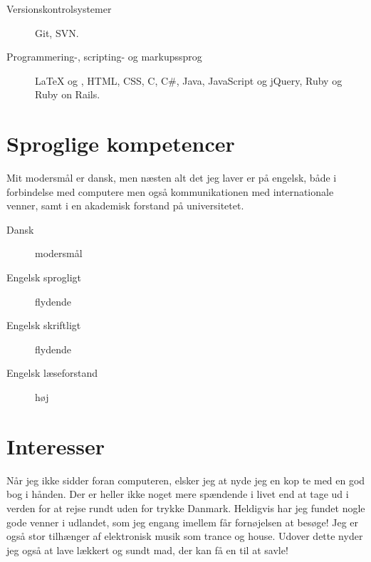 \documentclass[margin,line,a4paper]{resume}
\begin{document}
\begin{resume}
\begin{description}
  \item[Versionskontrolsystemer] Git, SVN.

  \item[Programmering-, scripting- og markupssprog] \LaTeX{} og
  \XeTeX{}, HTML, CSS, C, C\#, Java, JavaScript og jQuery, Ruby og Ruby
  on Rails.

\end{description}

\section{\mysidestyle Sproglige kompetencer}
Mit modersmål er dansk, men næsten alt det jeg laver er på engelsk,
både i forbindelse med computere men også kommunikationen med
internationale venner, samt i en akademisk forstand på universitetet.

\begin{description}
  \item[Dansk] modersmål
  \item[Engelsk sprogligt] flydende
  \item[Engelsk skriftligt] flydende
  \item[Engelsk læseforstand] høj
\end{description}

\section{\mysidestyle Interesser}

Når jeg ikke sidder foran computeren, elsker jeg at nyde jeg en kop
te med en god bog i hånden. Der er heller ikke noget mere spændende
i livet end at tage ud i verden for at rejse rundt uden for trykke
Danmark. Heldigvis har jeg fundet nogle gode venner i udlandet, som jeg
engang imellem får fornøjelsen at besøge! Jeg er også stor tilhænger af
elektronisk musik som trance og house. Udover dette nyder jeg også at
lave lækkert og sundt mad, der kan få en til at savle!

\end{resume}
\end{document}
